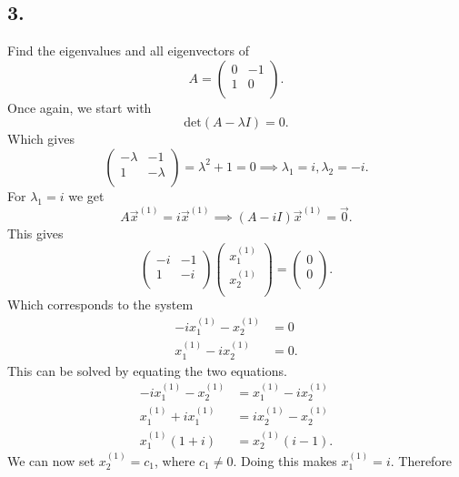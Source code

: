 \subsection*{3.} Find the eigenvalues and all eigenvectors of
\[ 
A = \begin{pmatrix}
0 & -1\\
1 & 0\\
\end{pmatrix}
.\]
\bigbreak
Once again, we start with
\[ 
\mathrm{det}(A-\lambda I) = 0
.\]
Which gives
\[ 
\begin{pmatrix}
-\lambda & -1\\
1 & -\lambda\\
\end{pmatrix} = \lambda^2 + 1 = 0 \implies \lambda_1 = i, \lambda_2 = -i
.\]
For $\lambda_1 = i$ we get
\[ 
A \Vec{x}^{(1)} = i \Vec{x}^{(1)} \implies (A - iI)\Vec{x}^{(1)} = \Vec{0}
.\]
This gives
\[ 
\begin{pmatrix}
-i & -1\\
1 & -i\\
\end{pmatrix} \begin{pmatrix}
x_1^{(1)}\\
x_2^{(1)}\\
\end{pmatrix} = \begin{pmatrix}
0\\
0\\
\end{pmatrix}
.\]
Which corresponds to the system
\begin{align*}
  -i x_1^{(1)} - x_2^{(1)} &= 0 \\
  x_1^{(1)} - ix_2^{(1)} &= 0
.\end{align*}
This can be solved by equating the two equations.
\begin{align*}
  -ix_1^{(1)} - x_2^{(1)} &= x_1^{(1)} - ix_2^{(1)} \\
  x_1^{(1)} + ix_1^{(1)} &= ix_2^{(1)} -x_2^{(1)} \\
  x_1^{(1)}(1 + i) &= x_2^{(1)}(i-1)
.\end{align*}
We can now set $x_2^{(1)} = c_1$, where $c_1 \neq 0$. Doing this makes $x_1^{(1)} = i$. Therefore




